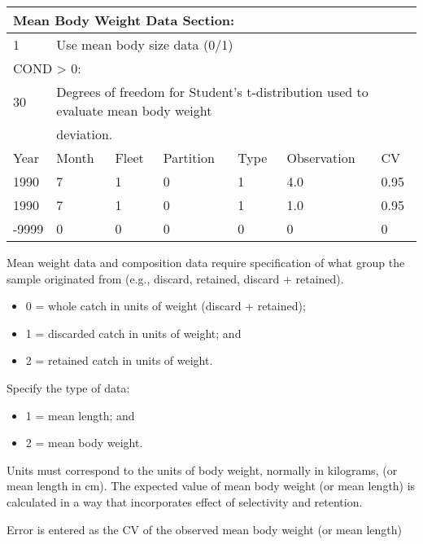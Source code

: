 \begin{center}
	\begin{tabular}{p{1.75cm} p{1.75cm} p{1.75cm} p{1.75cm} p{1.75cm} p{2cm} p{2.8cm}}
		\multicolumn{7}{l}{Mean Body Weight Data Section:}\\
		\hline
		1  & \multicolumn{6}{l}{Use mean body size data (0/1) } \Tstrut\Bstrut\\
		\hline
		\multicolumn{7}{l}{COND > 0:}\Tstrut\\
		30 & \multicolumn{6}{l}{Degrees of freedom for Student's t-distribution used to evaluate mean body weight } \\
		  & \multicolumn{6}{l}{deviation.}\Bstrut\\
		\hline
		Year & Month & Fleet & Partition & Type & Observation & CV\Tstrut\Bstrut\\
		\hline
		1990  & 7 & 1 & 0 & 1 & 4.0 & 0.95 \Tstrut\\
		1990  & 7 & 1 & 0 & 1 & 1.0 & 0.95 \\
		-9999 & 0 & 0 & 0 & 0 & 0   & 0 \Bstrut\\
		\hline
	\end{tabular}
\end{center}


Mean weight data and composition data require specification of what group the sample originated from (e.g., discard, retained, discard + retained).
\begin{itemize}
	\item 0 = whole catch in units of weight (discard + retained);
	\item 1 = discarded catch in units of weight; and
	\item 2 = retained catch in units of weight.
\end{itemize}

Specify the type of data:
\begin{itemize}
	\item 1 = mean length; and
	\item 2 = mean body weight.
\end{itemize}

Units must correspond to the units of body weight, normally in kilograms, (or mean length in cm).  The expected value of mean body weight (or mean length) is calculated in a way that incorporates effect of selectivity and retention.

Error is entered as the CV of the observed mean body weight (or mean length)

